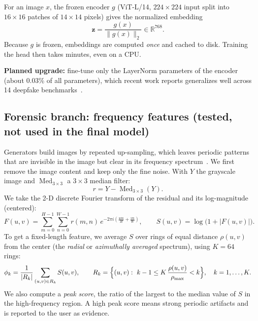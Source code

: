 \documentclass[11pt,a4paper]{article}
\begin{document}
For an image $x$, the frozen encoder $g$ (ViT-L/14, $224{\times}224$ input split into $16{\times}16$
patches of $14{\times}14$ pixels) gives the normalized embedding
\begin{equation}
  \mathbf{z}=\frac{g(x)}{\lVert g(x)\rVert_2}\in\mathbb{R}^{768}.
\end{equation}
Because $g$ is frozen, embeddings are computed \emph{once} and cached to disk. Training the head
then takes minutes, even on a CPU.

\textbf{Planned upgrade:} fine-tune only the LayerNorm parameters of the encoder (about 0.03\% of
all parameters), which recent work reports generalizes well across 14 deepfake
benchmarks~\cite{gend}.

\subsection{Forensic branch: frequency features (tested, not used in the final model)}
Generators build images by repeated up-sampling, which leaves periodic patterns that are
invisible in the image but clear in its frequency spectrum~\cite{durall}. We first remove the
image content and keep only the fine noise. With $Y$ the grayscale image and
$\operatorname{Med}_{3\times3}$ a $3{\times}3$ median filter:
\begin{equation}
  r = Y - \operatorname{Med}_{3\times3}(Y).
  \label{eq:residual}
\end{equation}
We take the 2-D discrete Fourier transform of the residual and its log-magnitude (centered):
\begin{equation}
  F(u,v)=\sum_{m=0}^{H-1}\sum_{n=0}^{W-1} r(m,n)\,e^{-2\pi i\left(\frac{um}{H}+\frac{vn}{W}\right)},
  \qquad S(u,v)=\log\bigl(1+\lvert F(u,v)\rvert\bigr).
\end{equation}
To get a fixed-length feature, we average $S$ over rings of equal distance $\rho(u,v)$ from the
center (the \emph{radial} or \emph{azimuthally averaged} spectrum), using $K=64$ rings:
\begin{equation}
  \phi_k=\frac{1}{\lvert R_k\rvert}\sum_{(u,v)\in R_k} S(u,v),\qquad
  R_k=\Bigl\{(u,v):\ k-1\le K\,\frac{\rho(u,v)}{\rho_{\max}}<k\Bigr\},\quad k=1,\dots,K.
  \label{eq:radial}
\end{equation}
We also compute a \emph{peak score}, the ratio of the largest to the median value of $S$ in the
high-frequency region. A high peak score means strong periodic artifacts and is reported to the
user as evidence.
\end{document}
